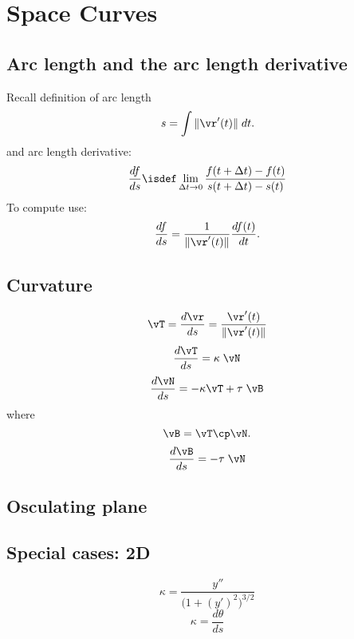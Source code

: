 \chapter{Space Curves}
\section{Arc length and the arc length derivative}
Recall definition of arc length
\begin{equation}
  \label{eq:arclength-def}
  s = \int \|\vr'(t)\|\; dt.
\end{equation}
and arc length derivative:
\begin{equation}
  \frac{df}{ds} \isdef
  \lim_{\Delta t\to 0} 
  \frac{f(t+\Delta t) - f(t)}{s(t+\Delta t) - s(t)}
  \label{eq:arc-length-deriv-def}
\end{equation}
To compute use:
\begin{equation}
  \frac{df}{ds} = \frac{1}{\|\vr'(t)\|} \frac{df(t)}{dt}.
  \label{eq:arclenght-deriv}
\end{equation}
\section{Curvature}
\begin{equation}
  \vT = \frac{d\vr}{ds} = \frac{\vr'(t)}{\|\vr'(t)\|}
  \label{eq:unit-tangent-def}
\end{equation}
\begin{equation}
  \frac{d\vT}{ds} = \kappa\; \vN 
  \label{eq:first-Serret-Frenet}
\end{equation}
\begin{equation}
  \frac{d\vN}{ds} = -\kappa\vT + \tau\; \vB 
  \label{eq:second-Serret-Frenet}
\end{equation}
where
\[
\vB= \vT\cp\vN.
\]
\begin{equation}
  \frac{d\vB}{ds} = -\tau\; \vN 
  \label{eq:third-Serret-Frenet}
\end{equation}

\section{Osculating plane}

\section{Special cases: 2D}
\begin{equation}
  \kappa = \frac{y''}{\bigl(1+(y')^2\bigr)^{3/2}}
  \label{eq:curvature-of-graph}
\end{equation}
\begin{equation}
  \kappa = \frac{d\theta}{ds}
  \label{eq:curvature-is-deriv-of-tangentangle}
\end{equation}
